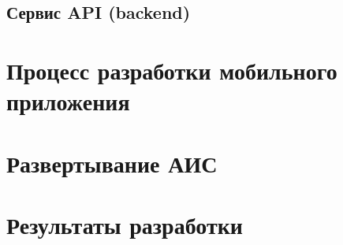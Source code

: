 \subsection{Сервис API (backend)}



\section{Процесс разработки мобильного приложения}

\section{Развертывание АИС}

\section{Результаты разработки}